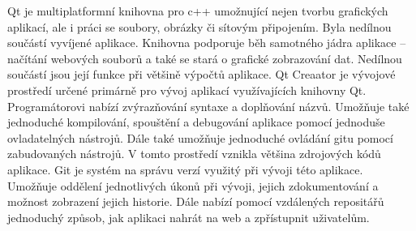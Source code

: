 







Qt je multiplatformní knihovna pro c++ umožnující nejen tvorbu grafických aplikací, ale i práci se soubory, obrázky či sítovým připojením.
Byla nedílnou součástí vyvíjené aplikace.
Knihovna podporuje běh samotného jádra aplikace -- načítání webových souborů a také se stará o grafické zobrazování dat.
Nedílnou součástí jsou její funkce při většině výpočtů aplikace.
Qt Creaator je vývojové prostředí určené primárně pro vývoj aplikací využívajících knihovny Qt.
Programátorovi nabízí zvýrazňování syntaxe a doplňování názvů.
Umožňuje také jednoduché kompilování, spouštění a debugování aplikace pomocí jednoduše ovladatelných nástrojů.
Dále také umožňuje jednoduché ovládání gitu pomocí zabudovaných nástrojů.
V tomto prostředí vznikla většina zdrojových kódů aplikace.
Git je systém na správu verzí využitý při vývoji této aplikace.
Umožňuje oddělení jednotlivých úkonů při vývoji, jejich zdokumentování a možnost zobrazení jejich historie.
Dále nabízí pomocí vzdálených repositářů jednoduchý způsob, jak aplikaci nahrát na web a zpřístupnit uživatelům.



\begin{literatura}

\end{literatura}


